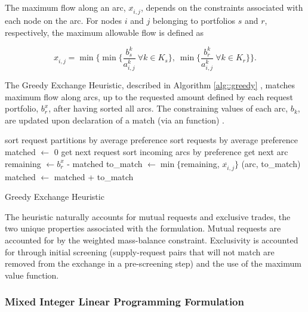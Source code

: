 The maximum flow along an arc, $x^{\widehat{}}_{i, j}$, depends on the
constraints associated with each node on the arc. For nodes $i$ and $j$
belonging to portfolios $s$ and $r$, respectively, the maximum allowable flow is
defined as

\begin{equation}
  x^{\widehat{}}_{i, j} = \min 
        \lbrace 
        \min \lbrace \frac{b^k_s}{a^k_{i, j}} 
        \: \forall k \in K_s \rbrace, 
        \: \min \lbrace \frac{b^k_r}{a^k_{i, j}} 
        \: \forall k \in K_r \rbrace
        \rbrace.
\end{equation}

The Greedy Exchange Heuristic, described in Algorithm \ref{alg::greedy} ,
matches maximum flow along arcs, up to the requested amount defined by each
request portfolio, $b^x_r$, after having sorted all arcs. The constraining values
of each arc, $b_k$, are updated upon declaration of a match (via an
 function) .

\begin{algorithm}[!h]
 \SetAlgoLined
 sort request partitions by average preference\;
  {
   sort requests by average preference\;
   matched $\leftarrow$ 0\;        
    {
     get next request\;
     sort incoming arcs by preference\;
      {
       get next arc\;
       remaining $\leftarrow b^x_r$ - matched\;
       to\_match $\leftarrow \min \lbrace$remaining, $x^{\widehat{}}_{i, j} \rbrace$\;
       (arc, to\_match)\;
       matched $\leftarrow$ matched + to\_match\;
     }
   }
 }
 \caption{Greedy Exchange Heuristic}\label{alg::greedy}
\end{algorithm}

The heuristic naturally accounts for mutual requests and exclusive trades, the
two unique properties associated with the formulation. Mutual requests are
accounted for by the weighted mass-balance constraint. Exclusivity is accounted
for through initial screening (supply-request pairs that will not match are
removed from the exchange in a pre-screening step) and the use of the maximum
value function.

\subsubsection{Mixed Integer Linear Programming Formulation}\label{abm:dre:milp}

